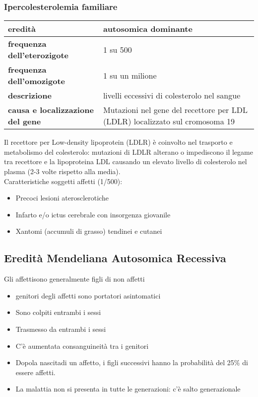 \documentclass{article}
\begin{document}
\subsubsection{Ipercolesterolemia familiare}
\begin{center}
    \begin{tabular}{lp{}}
        \toprule
        \textbf{eredità} & autosomica dominante\\
        \midrule
        \textbf{frequenza dell'eterozigote} & 1 su 500\\
        \midrule
        \textbf{frequenza dell'omozigote} & 1 su un milione\\
        \midrule
        \textbf{descrizione} & livelli eccessivi di colesterolo nel sangue\\
        \midrule
        \textbf{causa e localizzazione del gene} & Mutazioni nel gene del recettore per LDL (LDLR) localizzato sul cromosoma 19\\
        \bottomrule
    \end{tabular}
\end{center}
Il recettore per Low-density lipoprotein (LDLR) è coinvolto nel
trasporto e metabolismo del colesterolo: mutazioni di LDLR alterano
o impediscono il legame tra recettore e la lipoproteina LDL
causando un elevato livello di colesterolo nel plasma (2-3 volte
rispetto alla media).\\
Caratteristiche soggetti affetti (1/500):
\begin{itemize}
    \item Precoci lesioni aterosclerotiche
    \item Infarto e/o ictus cerebrale con insorgenza giovanile
    \item Xantomi (accumuli di grasso) tendinei e cutanei
\end{itemize}
\subsection{Eredità Mendeliana Autosomica Recessiva}
Gli affettisono generalmente figli di non affetti
\begin{itemize}
    \item genitori degli affetti sono portatori asintomatici
    \item Sono colpiti entrambi i sessi
    \item Trasmesso da entrambi i sessi
    \item C'è aumentata consanguineità tra i genitori
    \item Dopola nascitadi un affetto, i figli successivi hanno la probabilità del 25$\%$ di essere affetti.
    \item La malattia non si presenta in tutte le generazioni: c'è salto generazionale
\end{itemize}  
\end{document}

